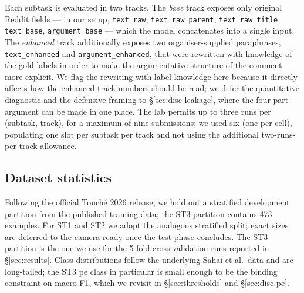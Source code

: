 Each subtask is evaluated in two tracks. The \emph{base} track exposes only original Reddit fields --- in our setup, \texttt{text\_raw}, \texttt{text\_raw\_parent}, \texttt{text\_raw\_title}, \texttt{text\_base}, \texttt{argument\_base} --- which the model concatenates into a single input. The \emph{enhanced} track additionally exposes two organiser-supplied paraphrases, \texttt{text\_enhanced} and \texttt{argument\_enhanced}, that were rewritten with knowledge of the gold labels in order to make the argumentative structure of the comment more explicit. We flag the rewriting-with-label-knowledge here because it directly affects how the enhanced-track numbers should be read; we defer the quantitative diagnostic and the defensive framing to \S\ref{sec:disc-leakage}, where the four-part argument can be made in one place. The lab permits up to three runs per (subtask, track), for a maximum of nine submissions; we used six (one per cell), populating one slot per subtask per track and not using the additional two-runs-per-track allowance.

\subsection{Dataset statistics}
\label{sec:task-stats}

Following the official Touch\'{e} 2026 release, we hold out a stratified development partition from the published training data; the ST3 partition contains 473 examples. %
For ST1 and ST2 we adopt the analogous stratified split; exact sizes are deferred to the camera-ready once the test phase concludes. The ST3 partition is the one we use for the 5-fold cross-validation runs reported in \S\ref{sec:results}. %
Class distributions follow the underlying Sahai et al.\ data and are long-tailed; the ST3 \textsf{pe} class in particular is small enough to be the binding constraint on macro-F1, which we revisit in \S\ref{sec:thresholds} and \S\ref{sec:disc-pe}.
